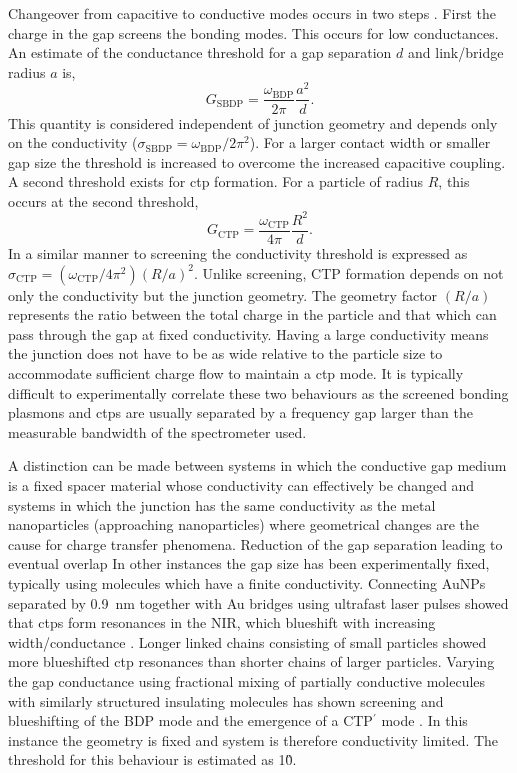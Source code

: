 \documentclass{article}
\begin{document}
Changeover from capacitive to conductive modes occurs in two steps \cite{perez2010}. First the charge in the gap screens the bonding modes. This occurs for low conductances. An estimate of the conductance threshold for a gap separation $d$ and {\color{red}link/bridge} radius $a$ is,
\begin{equation}
G_{\mathrm{SBDP}} = \frac{\omega_{\mathrm{BDP}}}{2\pi}\frac{a^2}{d}.
\end{equation}
This quantity is considered independent of junction geometry and depends only on the conductivity ($\sigma_{\mathrm{SBDP}} = \omega_{\mathrm{BDP}}/2\pi^2$). For a larger contact width or smaller gap size the threshold is increased to overcome the increased capacitive coupling.
A second threshold exists for \gls{ctp} formation. For a particle of radius $R$, this occurs at the second threshold,
\begin{equation}
G_{\mathrm{CTP}} = \frac{\omega_{\mathrm{CTP}}}{4\pi}\frac{R^2}{d}.
\end{equation}
In a similar manner to screening the conductivity threshold is expressed as $\sigma_{\mathrm{CTP}} = (\omega_{\mathrm{CTP}}/4\pi^2) (R/a)^2$. Unlike screening, CTP formation depends on not only the conductivity but the junction geometry. The geometry factor $(R/a)$ represents the ratio between the total charge in the particle and that which can pass through the gap at fixed conductivity. Having a large conductivity means the junction does not have to be as wide relative to the particle size to accommodate sufficient charge flow to maintain a \gls{ctp} mode.
It is typically difficult to experimentally correlate these two behaviours as the screened bonding plasmons and \glspl{ctp} are usually separated by a frequency gap larger than the measurable bandwidth of the spectrometer used.

A distinction can be made between systems in which the conductive gap medium is a fixed spacer material whose conductivity can effectively be changed and systems in which the junction has the same conductivity as the metal nanoparticles (approaching nanoparticles) where geometrical changes are the cause for charge transfer phenomena.
Reduction of the gap separation leading to eventual overlap
In other instances the gap size has been experimentally fixed, typically using molecules which have a finite conductivity. Connecting AuNPs separated by \SI{0.9}{nm} together with Au bridges using ultrafast laser pulses showed that \glspl{ctp} form resonances in the NIR, which blueshift with increasing width/conductance \cite{herrmann2014, tserkezis2014}. Longer linked chains consisting of small particles showed more blueshifted \gls{ctp} resonances than shorter chains of larger particles.
Varying the gap conductance using fractional mixing of partially conductive molecules with similarly structured insulating molecules has shown screening and blueshifting of the BDP mode and the emergence of a CTP$^\prime$ mode \cite{benz2014}. In this instance the geometry is fixed and system is therefore conductivity limited. The threshold for this behaviour is estimated as 1\G0.
\end{document}
